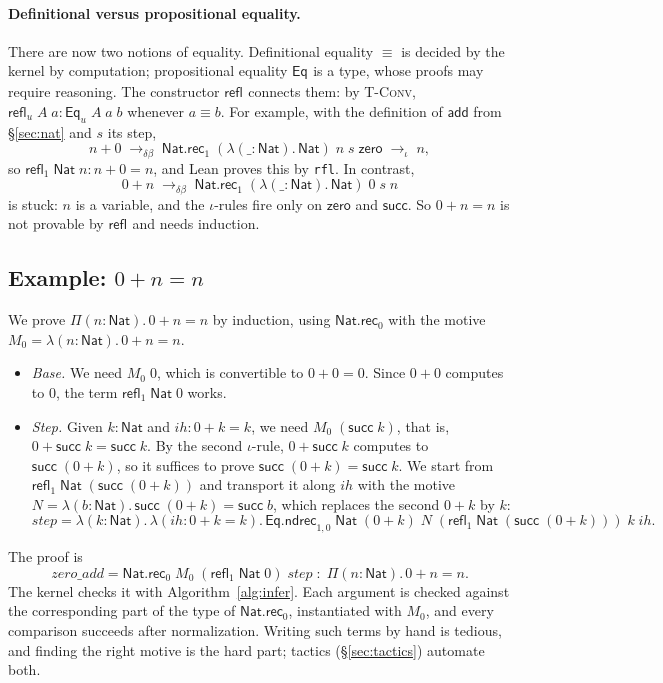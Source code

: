 \documentclass[acmsmall,screen,nonacm]{acmart}
\newcommand{\tPi}[3]{\Pi(#1{:}#2).\,#3}
\newcommand{\tLam}[3]{\lambda(#1{:}#2).\,#3}
\newcommand{\conv}{\equiv}
\newcommand{\Nat}{\mathsf{Nat}}
\newcommand{\zero}{\mathsf{zero}}
\newcommand{\tsucc}{\mathsf{succ}}
\newcommand{\add}{\mathsf{add}}
\newcommand{\NatRec}[1]{\mathsf{Nat.rec}_{#1}}
\newcommand{\Eq}[1]{\mathsf{Eq}_{#1}}
\newcommand{\refl}[1]{\mathsf{refl}_{#1}}
\newcommand{\EqRec}[1]{\mathsf{Eq.ndrec}_{#1}}
\newcommand{\iotared}{\to_{\iota}}
\begin{document}
\paragraph{Definitional versus propositional equality.}
There are now two notions of equality.
Definitional equality $\conv$ is decided by the kernel by computation; propositional equality $\Eq{}$ is a type, whose proofs may require reasoning.
The constructor $\refl{}$ connects them: by \textsc{T-Conv}, $\refl{u}\;A\;a : \Eq{u}\;A\;a\;b$ whenever $a \conv b$.
For example, with the definition of $\add$ from \S\ref{sec:nat} and $s$ its step,
\[
n + 0 \;\to_{\delta\beta}\; \NatRec{1}\;(\tLam{\_}{\Nat}{\Nat})\;n\;s\;\zero \;\iotared\; n,
\]
so $\refl{1}\;\Nat\;n : n + 0 = n$, and Lean proves this by \texttt{rfl}.
In contrast,
\[
0 + n \;\to_{\delta\beta}\; \NatRec{1}\;(\tLam{\_}{\Nat}{\Nat})\;0\;s\;n
\]
is stuck: $n$ is a variable, and the $\iota$-rules fire only on $\zero$ and $\tsucc$.
So $0 + n = n$ is not provable by $\refl{}$ and needs induction.

\subsection{Example: $0 + n = n$}
\label{sec:zero-add}

We prove $\tPi{n}{\Nat}{0 + n = n}$ by induction, using $\NatRec{0}$ with the motive $M_0 = \tLam{n}{\Nat}{0 + n = n}$.
\begin{itemize}
  \item \emph{Base.} We need $M_0\;0$, which is convertible to $0 + 0 = 0$. Since $0 + 0$ computes to $0$, the term $\refl{1}\;\Nat\;0$ works.
  \item \emph{Step.} Given $k : \Nat$ and $\mathit{ih} : 0 + k = k$, we need $M_0\;(\tsucc\;k)$, that is, $0 + \tsucc\;k = \tsucc\;k$.
    By the second $\iota$-rule, $0 + \tsucc\;k$ computes to $\tsucc\;(0 + k)$, so it suffices to prove $\tsucc\;(0 + k) = \tsucc\;k$.
    We start from $\refl{1}\;\Nat\;(\tsucc\;(0 + k))$ and transport it along $\mathit{ih}$ with the motive $N = \tLam{b}{\Nat}{\tsucc\;(0 + k) = \tsucc\;b}$,
    which replaces the second $0 + k$ by $k$:
    \[
    \mathit{step} = \tLam{k}{\Nat}{\tLam{\mathit{ih}}{0 + k = k}{
      \EqRec{1,0}\;\Nat\;(0 + k)\;N\;(\refl{1}\;\Nat\;(\tsucc\;(0 + k)))\;k\;\mathit{ih}}}.
    \]
\end{itemize}
The proof is
\[
\mathit{zero\_add} = \NatRec{0}\;M_0\;(\refl{1}\;\Nat\;0)\;\mathit{step} \;:\; \tPi{n}{\Nat}{0 + n = n}.
\]
The kernel checks it with Algorithm~\ref{alg:infer}.
Each argument is checked against the corresponding part of the type of $\NatRec{0}$, instantiated with $M_0$, and every comparison succeeds after normalization.
Writing such terms by hand is tedious, and finding the right motive is the hard part; tactics (\S\ref{sec:tactics}) automate both.
\end{document}
